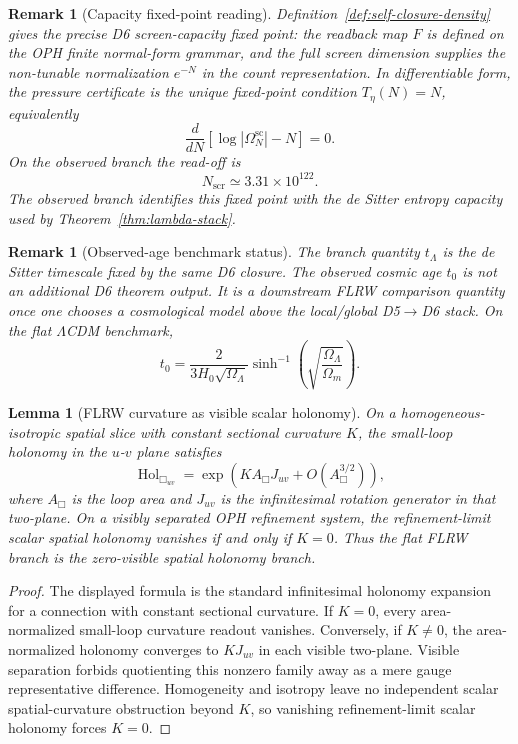 \documentclass[11pt]{article}
\newtheorem{lemma}[theorem]{Lemma}
\newtheorem{remark}[theorem]{Remark}
\begin{document}
\begin{remark}[Capacity fixed-point reading]\label{rem:self-closure-counting-target}
Definition~\ref{def:self-closure-density} gives the precise D6 screen-capacity fixed point: the
readback map \(F\) is defined on the OPH finite normal-form grammar, and the full screen dimension
supplies the non-tunable normalization \(e^{-N}\) in the count representation. In differentiable
form, the pressure certificate is the unique fixed-point
condition \(T_\eta(N)=N\), equivalently
\[
\frac{d}{dN}\left[\log|\Omega^{\mathrm{sc}}_N|-N\right]=0.
\]
On the observed branch the read-off is
\[
N_{\mathrm{scr}}\simeq3.31\times10^{122}.
\]
The observed branch identifies this fixed point with the de Sitter entropy capacity used by
Theorem~\ref{thm:lambda-stack}.
\end{remark}

\begin{remark}[Observed-age benchmark status]\label{rem:lambda-age}
The branch quantity \(t_\Lambda\) is the de Sitter timescale fixed by the same D6 closure. The observed cosmic age \(t_0\) is not an additional D6 theorem output. It is a downstream FLRW comparison quantity once one chooses a cosmological model above the local/global D5\(\to\)D6 stack. On the flat \(\Lambda\)CDM benchmark,
\[
t_0=\frac{2}{3H_0\sqrt{\Omega_\Lambda}}
\sinh^{-1}\!\left(\sqrt{\frac{\Omega_\Lambda}{\Omega_m}}\right).
\]
\end{remark}

\begin{lemma}[FLRW curvature as visible scalar holonomy]\label{lem:flrw-curvature-holonomy}
On a homogeneous-isotropic spatial slice with constant sectional curvature \(K\), the small-loop
holonomy in the \(u\)-\(v\) plane satisfies
\[
\operatorname{Hol}_{\Box_{uv}}
=
\exp\!\left(KA_\Box J_{uv}+O(A_\Box^{3/2})\right),
\]
where \(A_\Box\) is the loop area and \(J_{uv}\) is the infinitesimal rotation generator in that
two-plane. On a visibly separated OPH refinement system, the refinement-limit scalar spatial
holonomy vanishes if and only if \(K=0\). Thus the flat FLRW branch is the zero-visible spatial
holonomy branch.
\end{lemma}

\begin{proof}
The displayed formula is the standard infinitesimal holonomy expansion for a connection with
constant sectional curvature. If \(K=0\), every area-normalized small-loop curvature readout
vanishes. Conversely, if \(K\ne0\), the area-normalized holonomy converges to \(KJ_{uv}\) in each
visible two-plane. Visible separation forbids quotienting this nonzero family away as a mere gauge
representative difference. Homogeneity and isotropy leave no independent scalar spatial-curvature
obstruction beyond \(K\), so vanishing refinement-limit scalar holonomy forces \(K=0\).
\end{proof}
\end{document}
